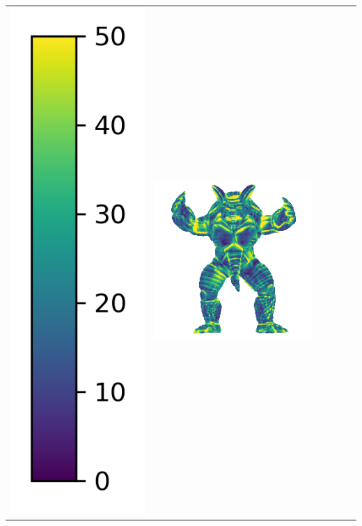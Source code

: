 \begin{center}
\begin{tabularx}{\linewidth}{@{}Y@{}Y@{}Y@{}Y@{}Y@{}Y@{}}
\includegraphics[width=0.2\linewidth]{semisynthetic/colorbar_error_vertical.png} &
\includegraphics[width=\linewidth]{semisynthetic/20150514_22_ours_err.png} &

\end{tabularx}
\end{center}
